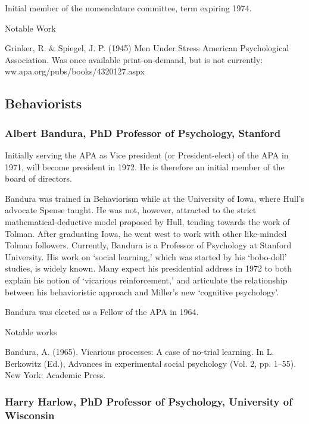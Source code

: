Initial member of the nomenclature committee, term expiring 1974.

Notable Work

Grinker, R. \& Spiegel, J. P. (1945) Men Under Stress American Psychological Association. Was once available print-on-demand, but is not currently: ww.apa.org\slash pubs\slash books\slash 4320127.aspx

\subsection{Behaviorists}
\label{behaviorists}

\subsubsection{Albert Bandura, PhD Professor of Psychology, Stanford}
\label{albertbanduraphdprofessorofpsychologystanford}

Initially serving the APA as Vice president (or President-elect) of the APA in 1971, will become president in 1972. He is therefore an initial member of the board of directors.

Bandura was trained in Behaviorism while at the University of Iowa, where Hull's advocate Spense taught. He was not, however, attracted to the strict mathematical-deductive model proposed by Hull, tending towards the work of Tolman. After graduating Iowa, he went west to work with other like-minded Tolman followers. Currently, Bandura is a Professor of Psychology at Stanford University. His work on `social learning,' which was started by his `bobo-doll' studies, is widely known. Many expect his presidential address in 1972 to both explain his notion of `vicarious reinforcement,' and articulate the relationship between his behavioristic approach and Miller's new `cognitive psychology'.

Bandura was elected as a Fellow of the APA in 1964.

Notable works

Bandura, A. (1965). Vicarious processes: A case of no-trial learning. In L. Berkowitz (Ed.), Advances in experimental social psychology (Vol. 2, pp. 1--55). New York: Academic Press.

\subsubsection{Harry Harlow, PhD Professor of Psychology, University of Wisconsin}
\label{harryharlowphdprofessorofpsychologyuniversityofwisconsin}

